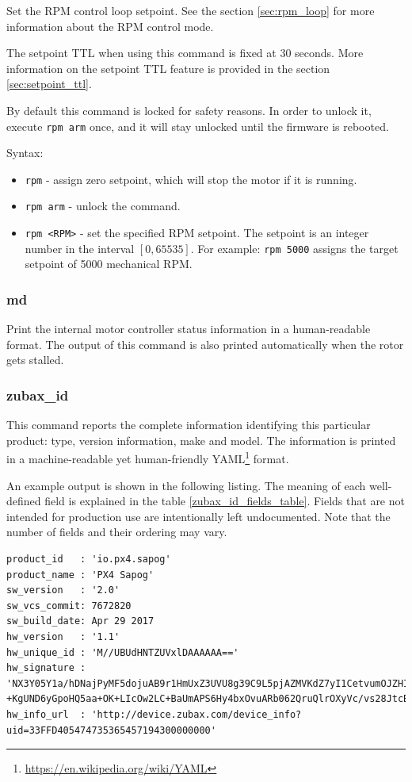 \documentclass{zubaxdoc}
\begin{document}
Set the RPM control loop setpoint.
See the section \ref{sec:rpm_loop} for more information about the RPM control mode.

The setpoint TTL when using this command is fixed at 30 seconds.
More information on the setpoint TTL feature is provided in the section \ref{sec:setpoint_ttl}.

By default this command is locked for safety reasons.
In order to unlock it, execute \verb|rpm arm| once, and it will stay unlocked until the firmware is rebooted.

Syntax:
\begin{itemize}
\item \verb|rpm| - assign zero setpoint, which will stop the motor if it is running.
\item \verb|rpm arm| - unlock the command.
\item \verb|rpm <RPM>| - set the specified RPM setpoint.
The setpoint is an integer number in the interval $\left[0, 65535\right]$.
For example: \verb|rpm 5000| assigns the target setpoint of 5000 mechanical RPM.
\end{itemize}

\subsubsection{md}

Print the internal motor controller status information in a human-readable format.
The output of this command is also printed automatically when the rotor gets stalled.

\subsubsection{zubax\_id}

This command reports the complete information identifying this particular product:
type, version information, make and model.
The information is printed in a machine-readable yet human-friendly
YAML\footnote{\url{https://en.wikipedia.org/wiki/YAML}} format.

An example output is shown in the following listing.
The meaning of each well-defined field is explained in the table \ref{zubax_id_fields_table}.
Fields that are not intended for production use are intentionally left undocumented.
Note that the number of fields and their ordering may vary.

\begin{verbatim}
product_id   : 'io.px4.sapog'
product_name : 'PX4 Sapog'
sw_version   : '2.0'
sw_vcs_commit: 7672820
sw_build_date: Apr 29 2017
hw_version   : '1.1'
hw_unique_id : 'M//UBUdHNTZUVxlDAAAAAA=='
hw_signature : 'NX3Y05Y1a/hDNajPyMF5dojuAB9r1HmUxZ3UVU8g39C9L5pjAZMVKdZ7yI1CetvumOJZHIjRYkHOBmMAEKvRU/3mpG\
+KgUND6yGpoHQ5aa+OK+LIcOw2LC+BaUmAPS6Hy4bxOvuARb062QruQlrOXyVc/vs28JtcBzOZo/b/OxY='
hw_info_url  : 'http://device.zubax.com/device_info?uid=33FFD405474735365457194300000000'
\end{verbatim}
\end{document}
